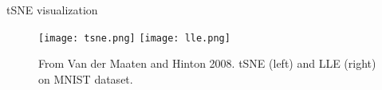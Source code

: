 \documentclass[final]{beamer}
\begin{document}
\begin{frame}{tSNE visualization}
\begin{figure}
	\texttt{[image: tsne.png]}
	\texttt{[image: lle.png]}
	\caption{From Van der Maaten and Hinton 2008. tSNE (left) and LLE (right) on MNIST dataset. }
\end{figure}
\end{frame}
\end{document}
